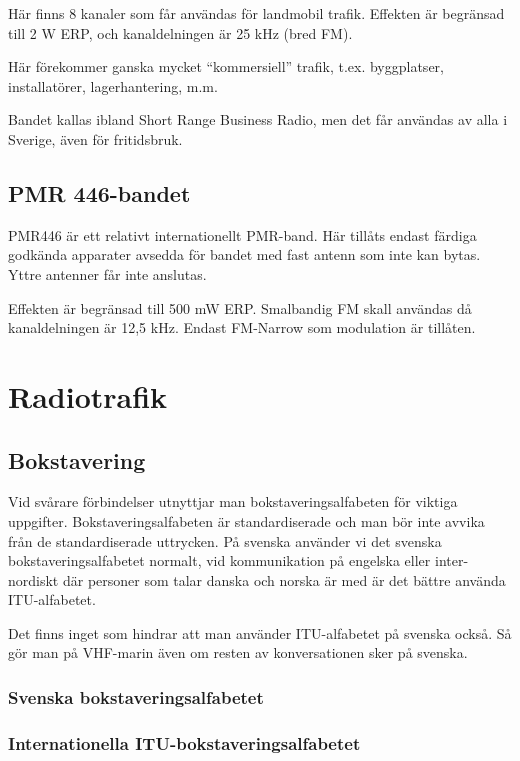 \documentclass[12ypt,swedish,a4paper]{report}
\begin{document}
Här finns 8 kanaler som får användas för landmobil trafik. Effekten är begränsad till 2 W ERP, och kanaldelningen är 25 kHz (bred FM).

Här förekommer ganska mycket ``kommersiell'' trafik, t.ex. byggplatser, installatörer, lagerhantering, m.m.

Bandet kallas ibland Short Range Business Radio, men det får användas av alla i Sverige, även för fritidsbruk.

\section{PMR 446-bandet}

PMR446 är ett relativt internationellt PMR-band. Här tillåts endast färdiga godkända apparater avsedda för bandet med fast antenn som inte kan bytas. Yttre antenner får inte anslutas.

Effekten är begränsad till 500 mW ERP. Smalbandig FM skall användas då kanaldelningen är 12,5 kHz.  Endast FM-Narrow som modulation är tillåten.

\chapter{Radiotrafik}
\label{kap:radiotrafik}

\section{Bokstavering}

Vid svårare förbindelser utnyttjar man bokstaveringsalfabeten för viktiga uppgifter. Bokstaveringsalfabeten är standardiserade och man bör inte avvika från de standardiserade uttrycken. På svenska använder vi det svenska bokstaveringsalfabetet normalt, vid kommunikation på engelska eller inter-nordiskt där personer som talar danska och norska är med är det bättre använda ITU-alfabetet.

Det finns inget som hindrar att man använder ITU-alfabetet på svenska också. Så gör man på VHF-marin även om resten av konversationen sker på svenska.

\subsection{Svenska bokstaveringsalfabetet}


\subsection{Internationella ITU-bokstaveringsalfabetet}
\end{document}

